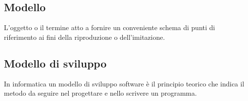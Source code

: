 \subsection*{Modello}
L'oggetto o il termine atto a fornire un conveniente schema di punti di riferimento ai fini della riproduzione o dell'imitazione.

\subsection*{Modello di sviluppo}
In informatica un modello di sviluppo software è il principio teorico che indica il metodo da seguire nel progettare e nello scrivere un programma.

